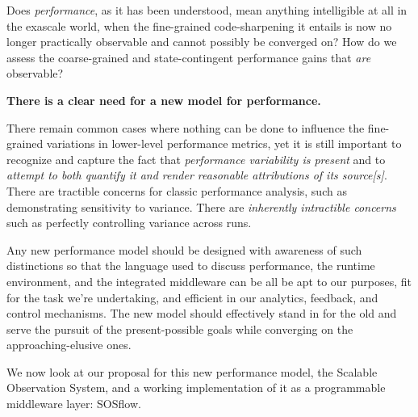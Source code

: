 

Does \textit{performance}, as it has been understood, mean anything
intelligible at all in the exascale world, when the fine-grained
code-sharpening it entails is now no longer practically observable and
cannot possibly be converged on? How do we assess the coarse-grained
and state-contingent performance gains that \textit{are} observable?

\textbf{There is a clear need for a new model for performance.}

There remain common cases where nothing can be done to influence the
fine-grained variations in lower-level performance metrics, yet it is
still important to recognize and capture the fact that
\textit{performance variability is present} and to \textit{attempt to
  both quantify it and render reasonable attributions of its
  source[s]}. There are tractible concerns for classic performance
analysis, such as demonstrating sensitivity to variance.  There are
\textit{inherently intractible concerns} such as perfectly controlling
variance across runs.

Any new performance model should be designed with awareness of such
distinctions so that the language used to discuss performance, the
runtime environment, and the integrated middleware can be all be apt
to our purposes, fit for the task we're undertaking, and efficient in
our analytics, feedback, and control mechanisms. The new model should
effectively stand in for the old and serve the pursuit of the
present-possible goals while converging on the approaching-elusive
ones.

We now look at our proposal for this new performance model, the
Scalable Observation System, and a working implementation of it
as a programmable middleware layer: SOSflow.



